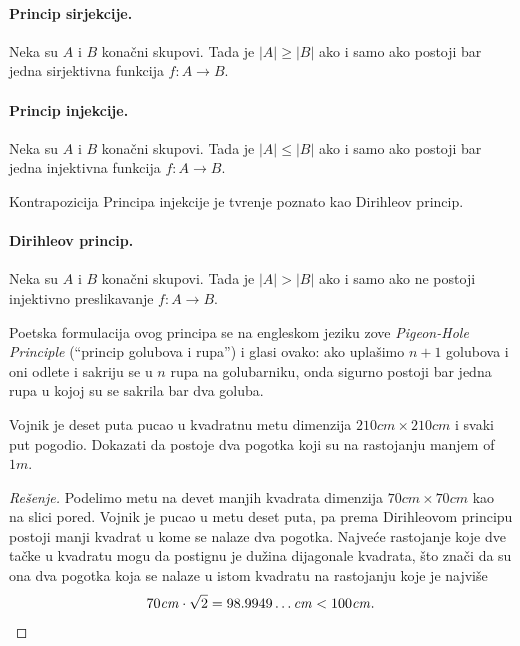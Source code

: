 \paragraph{Princip sirjekcije.}
  Neka su $A$ i $B$ kona\v cni skupovi. Tada je $|A| \ge |B|$ ako i samo ako postoji bar jedna sirjektivna funkcija $f : A \to B$.
\begin{center}
  
\end{center}

\paragraph{Princip injekcije.}
  Neka su $A$ i $B$ kona\v cni skupovi. Tada je $|A| \le |B|$ ako i samo ako postoji bar jedna injektivna funkcija $f : A \to B$.
\begin{center}
  
\end{center}

Kontrapozicija Principa injekcije je tvr\dj enje poznato kao Dirihleov princip.

\paragraph{Dirihleov princip.}
  Neka su $A$ i $B$ kona\v cni skupovi. Tada je $|A| > |B|$ ako i samo ako ne postoji injektivno preslikavanje $f : A \to B$.
  
\medskip

Poetska formulacija ovog principa se na engleskom jeziku zove \emph{Pigeon-Hole Principle} (\enquote{princip golubova i rupa}) i glasi ovako:
ako upla\v simo $n + 1$ golubova i oni odlete i sakriju se u $n$ rupa na golubarniku, onda sigurno postoji bar jedna rupa
u kojoj su se sakrila bar dva goluba.

\begin{EX}
  Vojnik je deset puta pucao u kvadratnu metu dimenzija $210\mathit{cm} \times 210\mathit{cm}$ i svaki put pogodio.
  Dokazati da postoje dva pogotka koji su na rastojanju manjem of $1\mathit{m}$.
\end{EX}

\noindent
\begin{minipage}{3in}
  \begin{proof}[Re\v senje]
    Podelimo metu na devet manjih kvadrata dimenzija $70\mathit{cm} \times 70\mathit{cm}$ kao na slici pored.
    Vojnik je pucao u metu deset puta, pa prema Dirihleovom principu
    postoji manji kvadrat u kome se nalaze dva pogotka.
    Najve\'ce rastojanje koje dve ta\v cke u kvadratu mogu da postignu je du\v zina dijagonale kvadrata, \v sto zna\v ci
    da su ona dva pogotka koja se nalaze u istom kvadratu na rastojanju koje je najvi\v se
    $$
      70\mathit{cm} \cdot \sqrt 2 = 98.9949\ldots\mathit{cm} < 100\mathit{cm}.\qedhere
    $$
  \end{proof}
\end{minipage}
\hfill
\begin{minipage}{2.5in}
  \begin{center}
    
  \end{center}
\end{minipage}



